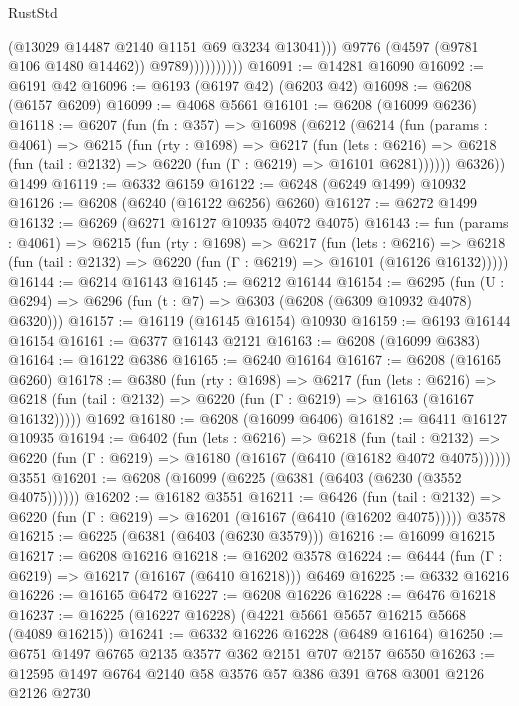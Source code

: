 \begin{lexlean}{RustStd}
\begin{coremodule}
                            (@13029 @14487 @2140 @1151 @69 @3234 @13041)))
                        @9776
                        (@4597 (@9781 @106 @1480 @14462))
                        @9789))))))))))
@16091 := @14281 @16090
@16092 := @6191 @42
@16096 := @6193 (@6197 @42) (@6203 @42)
@16098 := @6208 (@6157 @6209)
@16099 := @4068 @5661
@16101 := @6208 (@16099 @6236)
@16118 := @6207
    (fun (fn : @357) =>
    @16098
      (@6212
        (@6214
          (fun (params : @4061) =>
          @6215
            (fun (rty : @1698) =>
            @6217
              (fun (lets : @6216) =>
              @6218 (fun (tail : @2132) => @6220 (fun (Γ : @6219) => @16101 @6281))))))
        @6326))
    @1499
@16119 := @6332 @6159
@16122 := @6248 (@6249 @1499) @10932
@16126 := @6208 (@6240 (@16122 @6256) @6260)
@16127 := @6272 @1499
@16132 := @6269 (@6271 @16127 @10935 @4072 @4075)
@16143 := fun (params : @4061) =>
  @6215
    (fun (rty : @1698) =>
    @6217
      (fun (lets : @6216) =>
      @6218 (fun (tail : @2132) => @6220 (fun (Γ : @6219) => @16101 (@16126 @16132)))))
@16144 := @6214 @16143
@16145 := @6212 @16144
@16154 := @6295
    (fun (U : @6294) => @6296 (fun (t : @7) => @6303 (@6208 (@6309 @10932 @4078) @6320)))
@16157 := @16119 (@16145 @16154) @10930
@16159 := @6193 @16144 @16154
@16161 := @6377 @16143 @2121
@16163 := @6208 (@16099 @6383)
@16164 := @16122 @6386
@16165 := @6240 @16164
@16167 := @6208 (@16165 @6260)
@16178 := @6380
    (fun (rty : @1698) =>
    @6217
      (fun (lets : @6216) =>
      @6218 (fun (tail : @2132) => @6220 (fun (Γ : @6219) => @16163 (@16167 @16132)))))
    @1692
@16180 := @6208 (@16099 @6406)
@16182 := @6411 @16127 @10935
@16194 := @6402
    (fun (lets : @6216) =>
    @6218
      (fun (tail : @2132) =>
      @6220 (fun (Γ : @6219) => @16180 (@16167 (@6410 (@16182 @4072 @4075))))))
    @3551
@16201 := @6208 (@16099 (@6225 (@6381 (@6403 (@6230 (@3552 @4075))))))
@16202 := @16182 @3551
@16211 := @6426
    (fun (tail : @2132) => @6220 (fun (Γ : @6219) => @16201 (@16167 (@6410 (@16202 @4075)))))
    @3578
@16215 := @6225 (@6381 (@6403 (@6230 @3579)))
@16216 := @16099 @16215
@16217 := @6208 @16216
@16218 := @16202 @3578
@16224 := @6444 (fun (Γ : @6219) => @16217 (@16167 (@6410 @16218))) @6469
@16225 := @6332 @16216
@16226 := @16165 @6472
@16227 := @6208 @16226
@16228 := @6476 @16218
@16237 := @16225 (@16227 @16228) (@4221 @5661 @5657 @16215 @5668 (@4089 @16215))
@16241 := @6332 @16226 @16228 (@6489 @16164)
@16250 := @6751 @1497 @6765 @2135 @3577 @362 @2151 @707 @2157 @6550
@16263 := @12595 @1497 @6764 @2140 @58 @3576 @57 @386 @391 @768 @3001 @2126 @2126 @2730

\end{coremodule}
\end{lexlean}
